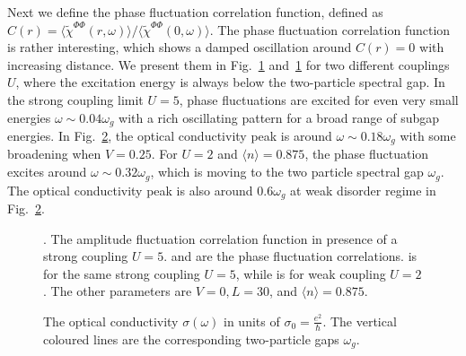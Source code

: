 \documentclass[Colective.tex]{revtex4-1}
\begin{document}
Next we define the phase fluctuation correlation function, defined as $C(r)=\langle\tilde{\chi}^{\Phi\Phi}(r,\omega)\rangle/\langle\tilde{\chi}^{\Phi\Phi}(0,\omega)\rangle$. The phase fluctuation correlation function is rather interesting, which shows a damped oscillation around $C(r)=0$ with increasing distance. We present them in Fig.~{\ref{Fig.pha_cor}} and~{\ref{Fig.pha_cor}} for two different couplings $U$, where the excitation energy is always below the two-particle spectral gap. {In the strong coupling limit $U=5$, phase fluctuations are excited for even very small energies $\omega \sim 0.04\omega_g$ with a rich oscillating pattern for a broad range of subgap energies. In Fig.~{\ref{Fig.cond_U5_2}}, the optical conductivity peak is around $\omega \sim 0.18\omega_g$ with some broadening when $V=0.25$. 
For $U=2$ and $\langle n \rangle = 0.875$, the phase fluctuation excites around $\omega \sim 0.32\omega_g$, which is moving to the two particle spectral gap $\omega_g$. The optical conductivity peak is also around $0.6\omega_g$ at weak disorder regime in Fig.~{\ref{Fig.cond_U5_2}}. }
\begin{figure}[H]
	\begin{center}
		\caption{ . The amplitude fluctuation correlation function in presence of a strong coupling $U=5$.  and  are the phase fluctuation correlations.  is for the same strong coupling $U=5$, while  is for weak coupling $U=2$. The other parameters are $V=0, L=30$, and $\langle n \rangle = 0.875$.} \label{Fig.pha_cor}
	\end{center}
\end{figure}
\begin{figure}[H]
	\begin{center}
		\caption{The optical conductivity $\sigma(\omega)$ in units of $\sigma_0=\frac{e^2}{\hbar}$. The vertical coloured lines are the corresponding two-particle gaps $\omega_g$. } \label{Fig.cond_U5_2}
	\end{center}
\end{figure}
	
\end{document}
